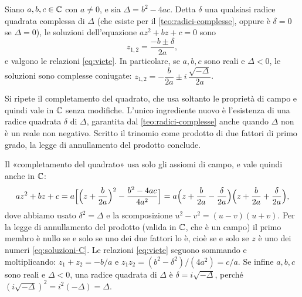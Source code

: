 \begin{proposizione}\label{prop:secondo-grado-C}
Siano $a,b,c\in\mathbb{C}$ con $a\neq0$, e sia $\Delta=b^{2}-4ac$. Detta $\delta$ una qualsiasi
radice quadrata complessa di $\Delta$ (che esiste per il \cref{teo:radici-complesse},
oppure è $\delta=0$ se $\Delta=0$), le soluzioni dell'equazione $az^{2}+bz+c=0$ sono
\begin{equation}\label{eq:soluzioni-C}
  z_{1,2}=\frac{-b\pm\delta}{2a},
\end{equation}
e valgono le relazioni \eqref{eq:viete}. In particolare, se $a,b,c$ sono reali e
$\Delta<0$, le soluzioni sono complesse coniugate:
$z_{1,2}=-\dfrac{b}{2a}\pm i\,\dfrac{\sqrt{-\Delta}}{2a}$.
\end{proposizione}

\begin{schema}
\end{schema}

\begin{strategia}
Si ripete il completamento del quadrato, che usa soltanto le proprietà di campo e
quindi vale in $\mathbb{C}$ senza modifiche. L'unico ingrediente nuovo è l'esistenza di una
radice quadrata $\delta$ di $\Delta$, garantita dal \cref{teo:radici-complesse} anche
quando $\Delta$ non è un reale non negativo. Scritto il trinomio come prodotto di due
fattori di primo grado, la legge di annullamento del prodotto conclude.
\end{strategia}

\begin{dimostrazione}
Il «completamento del quadrato» usa solo gli assiomi di campo, e vale quindi anche in
$\mathbb{C}$:
\[
  az^{2}+bz+c=a\Bigl[\Bigl(z+\frac{b}{2a}\Bigr)^{2}-\frac{b^{2}-4ac}{4a^{2}}\Bigr]
  =a\Bigl(z+\frac{b}{2a}-\frac{\delta}{2a}\Bigr)\Bigl(z+\frac{b}{2a}+\frac{\delta}{2a}\Bigr),
\]
dove abbiamo usato $\delta^{2}=\Delta$ e la scomposizione $u^{2}-v^{2}=(u-v)(u+v)$. Per
la legge di annullamento del prodotto (valida in $\mathbb{C}$, che è un campo) il primo membro è
nullo se e solo se uno dei due fattori lo è, cioè se e solo se $z$ è uno dei numeri
\eqref{eq:soluzioni-C}. Le relazioni \eqref{eq:viete} seguono sommando e moltiplicando:
$z_{1}+z_{2}=-b/a$ e $z_{1}z_{2}=(b^{2}-\delta^{2})/(4a^{2})=c/a$. Se infine $a,b,c$ sono
reali e $\Delta<0$, una radice quadrata di $\Delta$ è $\delta=i\sqrt{-\Delta}$, perché
$(i\sqrt{-\Delta})^{2}=i^{2}(-\Delta)=\Delta$.
\end{dimostrazione}

